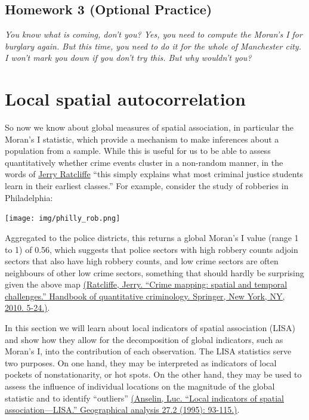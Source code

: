 \documentclass[]{book}
\begin{document}
\hypertarget{homework-3-optional-practice}{%
\subsection{Homework 3 (Optional Practice)}\label{homework-3-optional-practice}}

\emph{You know what is coming, don't you? Yes, you need to compute the Moran's I for burglary again. But this time, you need to do it for the whole of Manchester city. I won't mark you down if you don't try this. But why wouldn't you?}

\hypertarget{local-spatial-autocorrelation}{%
\section{Local spatial autocorrelation}\label{local-spatial-autocorrelation}}

So now we know about global measures of spatial association, in particular the Moran's I statistic, which provide a mechanism to make inferences about a population from a sample. While this is useful for us to be able to assess quantitatively whether crime events cluster in a non-random manner, in the words of \href{https://pdfs.semanticscholar.org/26d2/356618cd759d04348f1e51c8209b0175bfce.pdf}{Jerry Ratcliffe} ``this simply explains what most criminal justice students learn in their earliest classes.'' For example, consider the study of robberies in Philadelphia:

\texttt{[image: img/philly\_rob.png]}

Aggregated to the police districts, this returns a global Moran's I value (range 1 to 1) of 0.56, which suggests that police sectors with high robbery counts adjoin sectors that also have high robbery counts, and low crime sectors are often neighbours of other low crime sectors, something that should hardly be surprising given the above map \href{https://pdfs.semanticscholar.org/26d2/356618cd759d04348f1e51c8209b0175bfce.pdf}{(Ratcliffe, Jerry. ``Crime mapping: spatial and temporal challenges.'' Handbook of quantitative criminology. Springer, New York, NY, 2010. 5-24.)}.

In this section we will learn about local indicators of spatial association (LISA) and show how they allow for the decomposition of global indicators, such as Moran's I, into the contribution of each observation. The LISA statistics serve two purposes. On one hand, they may be interpreted as indicators of local pockets of nonstationarity, or hot spots. On the other hand, they may be used to assess the influence of individual locations on the magnitude of the global statistic and to identify ``outliers'' \href{http://onlinelibrary.wiley.com/doi/10.1111/j.1538-4632.1995.tb00338.x/full}{(Anselin, Luc. ``Local indicators of spatial association---LISA.'' Geographical analysis 27.2 (1995): 93-115.)}.
\end{document}
